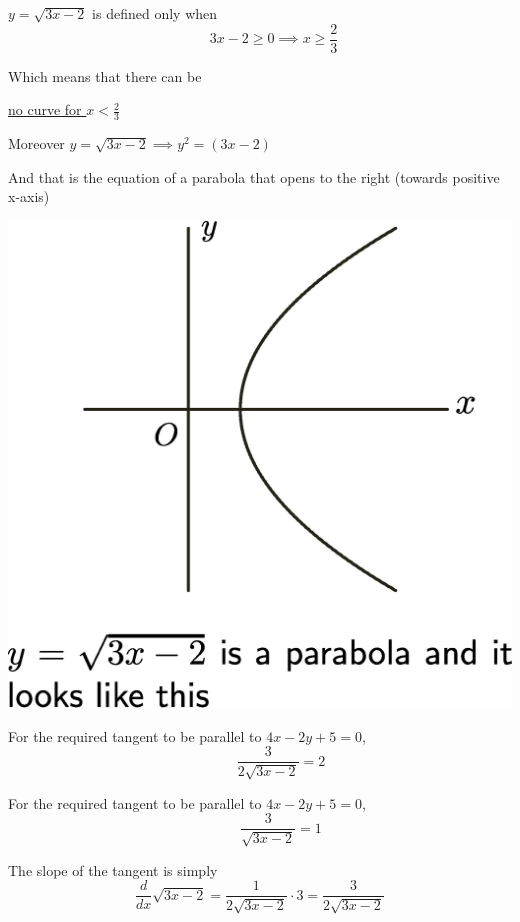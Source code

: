 \documentclass[14pt,fleqn]{extarticle}
\begin{document}
\newcard

\newcard 

$y= \sqrt{3x-2}$ is defined only when 
\[ \qquad 3x - 2 \geq 0 \implies x \geq \frac{2}{3}\]

Which means that there can be 

\underline{no curve for $x < \frac{2}{3}$} \newline 

Moreover $y = \sqrt{3x-2} \implies y^2 = \left(3x-2 \right)$ \newline 

And that is the equation of a parabola that opens to the right (towards positive x-axis) 

\begin{center}
\includegraphics[scale=0.25]{r-1.eps} 
\end{center} 

\newcard 

For the required tangent to be parallel to $4x-2y+5=0$, 
\[ \quad \qquad \frac{3}{2\sqrt{3x-2}} = 2 \]

\newcard 

For the required tangent to be parallel to $4x-2y+5=0$, 
\[ \quad \qquad \frac{3}{\sqrt{3x-2}} = 1 \]


\newcard 

The slope of the tangent is simply 
\[\frac{d}{dx}\sqrt{3x- 2} = \frac{1}{2\sqrt{3x-2}}\cdot 3 = \frac{3}{2\sqrt{3x-2}} \]
\end{document}
